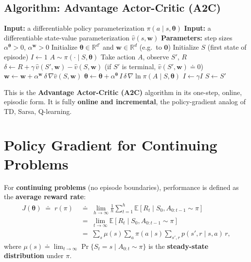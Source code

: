 \documentclass[11pt,a4paper]{article}
\theoremstyle{definition}
\theoremstyle{plain}
\theoremstyle{remark}
\begin{document}
\subsection{Algorithm: Advantage Actor-Critic (A2C)}

\begin{algorithm}[H]
\caption{One-step Actor-Critic (episodic), for estimating $\pi_{\boldsymbol{\theta}} \approx \pi_*$}
\begin{algorithmic}
\STATE \textbf{Input:} a differentiable policy parameterization $\pi(a \mid s, \boldsymbol{\theta})$
\STATE \textbf{Input:} a differentiable state-value parameterization $\hat{v}(s, \mathbf{w})$
\STATE \textbf{Parameters:} step sizes $\alpha^{\boldsymbol{\theta}} > 0$, $\alpha^{\mathbf{w}} > 0$
\STATE Initialize $\boldsymbol{\theta} \in \mathbb{R}^{d'}$ and $\mathbf{w} \in \mathbb{R}^d$ (e.g.\ to $\mathbf{0}$)
    \STATE Initialize $S$ (first state of episode)
    \STATE $I \leftarrow 1$
        \STATE $A \sim \pi(\cdot \mid S, \boldsymbol{\theta})$
        \STATE Take action $A$, observe $S'$, $R$
        \STATE $\delta \leftarrow R + \gamma\, \hat{v}(S', \mathbf{w}) - \hat{v}(S, \mathbf{w})$ \quad (if $S'$ is terminal, $\hat{v}(S', \mathbf{w}) \doteq 0$)
        \STATE $\mathbf{w} \leftarrow \mathbf{w} + \alpha^{\mathbf{w}}\, \delta\, \nabla \hat{v}(S, \mathbf{w})$
        \STATE $\boldsymbol{\theta} \leftarrow \boldsymbol{\theta} + \alpha^{\boldsymbol{\theta}}\, I\, \delta\, \nabla \ln \pi(A \mid S, \boldsymbol{\theta})$
        \STATE $I \leftarrow \gamma I$
        \STATE $S \leftarrow S'$
    \ENDWHILE
\ENDFOR
\end{algorithmic}
\end{algorithm}

This is the \textbf{Advantage Actor-Critic (A2C)} algorithm in its one-step, online, episodic form. It is fully \textbf{online and incremental}, the policy-gradient analog of TD, Sarsa, Q-learning.

\section{Policy Gradient for Continuing Problems}

For \textbf{continuing problems} (no episode boundaries), performance is defined as the \textbf{average reward rate}:
\begin{align*}
    J(\boldsymbol{\theta}) \;\doteq\; r(\pi) \;&\doteq\; \lim_{h \to \infty} \frac{1}{h} \sum_{t=1}^{h} \mathbb{E}[R_t \mid S_0, A_{0:t-1} \sim \pi] \\
                                              &=\; \lim_{t \to \infty} \mathbb{E}[R_t \mid S_0, A_{0:t-1} \sim \pi] \\
                                              &=\; \sum_s \mu(s) \sum_a \pi(a \mid s) \sum_{s', r} p(s', r \mid s, a)\, r,
\end{align*}
where $\mu(s) \doteq \lim_{t \to \infty} \Pr\{S_t = s \mid A_{0:t} \sim \pi\}$ is the \textbf{steady-state distribution} under $\pi$.
\end{document}
